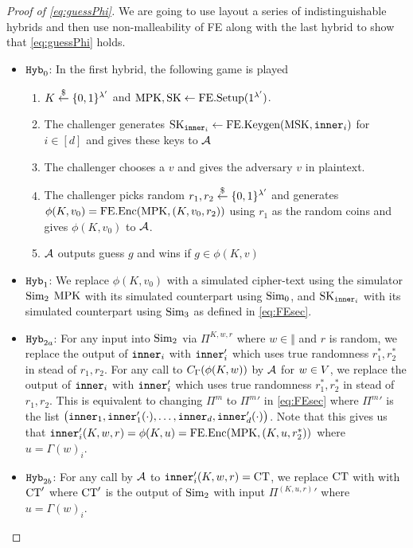\begin{proof}[Proof of \cref{eq:guessPhi}]
	We are going to use layout a series of indistinguishable hybrids and then use non-malleability of FE
	along with the last hybrid to show that \cref{eq:guessPhi} holds.
	\begin{itemize}
		\item $\texttt{Hyb}_0$: In the first hybrid, the following game is played
			\begin{enumerate}
				\item $K \overset{\$}{\gets} \{0,1\}^{\lambda'}$ and $\text{MPK}, \text{SK} \gets \text{FE.Setup}(1^{\lambda'})$.
				\item The challenger generates $\text{SK}_{\texttt{inner}_i} \gets \text{FE.Keygen}(\text{MSK}, \texttt{inner}_i)$ for $i \in [d]$ and gives these keys to $\mathcal{A}$
				\item The challenger chooses a $v$ and gives the adversary $v$ in plaintext.
				\item The challenger picks random $r_1, r_2 \overset{\$}{\gets} \{0,1\}^{\lambda'}$ and generates $\phi(K, v_0) = \text{FE.Enc}(\text{MPK}, (K, v_0, r_2))$ using $r_1$ as the random coins and gives $\phi(K, v_0)$ to $\mathcal{A}$.
				\item $\mathcal{A}$ outputs guess $g$ and wins if $g \in \phi(K, v)$
			\end{enumerate}
		\item $\texttt{Hyb}_1$: We replace $\phi(K, v_0)$ with a simulated cipher-text using the simulator $\text{Sim}_2$ 
		$\text{MPK}$ with its simulated counterpart using $\text{Sim}_0$, and $\text{SK}_{\texttt{inner}_i}$ with its simulated counterpart using $\text{Sim}_3$ as defined in \cref{eq:FEsec}.

		\item $\texttt{Hyb}_{2a}$: For any input into $\text{Sim}_2$ via $\Pi^{K, w, r}$ where $w \in \Vert$
		and $r$ is random, we replace the output of $\texttt{inner}_i$ with $\texttt{inner}_i'$ which uses true randomness $r_1^*, r_2^*$ in stead of $r_1, r_2$.
		For any call to $C_\Gamma(\phi(K, w))$ by $\mathcal{A}$ for $w \in V$,
		we replace the output of $\texttt{inner}_i$ with $\texttt{inner}_i'$ which uses true randomness $r_1^*, r_2^*$ in stead of $r_1, r_2$.
		This is equivalent to changing $\Pi^m$ to ${\Pi^m}'$ in \cref{eq:FEsec} where ${\Pi^{m}}'$ is 
		the list $\big(\texttt{inner}_1, \texttt{inner}_1'(\cdot), \dots, \texttt{inner}_d, \texttt{inner}_d'(\cdot)\big)$.
		Note that this gives us that $\texttt{inner}_i'(K, w, r) = \phi(K, u) = \text{FE.Enc}(\text{MPK}, (K, u, r^*_2))$ where $u = \Gamma(w)_i$.

		\item $\texttt{Hyb}_{2b}$: For any call by $\mathcal{A}$ to $\texttt{inner}_i'(K, w, r) = \text{CT}$, we replace $\text{CT}$ with
		with $\text{CT}'$ where $\text{CT}'$ is the output of $\text{Sim}_2$ with input ${\Pi^{(K, u, r)}}'$ where $u = \Gamma(w)_i$.


\end{itemize}
\end{proof}
